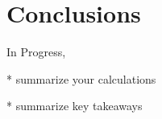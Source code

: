 \documentclass[twocolumn,prd,nofootinbib]{revtex4}
\newcommand\AddedResponse[1]{{\color{blue} {#1}}}
\newcommand\editremark[1]{{\color{red} #1}}
\newcommand{\mc}{{\cal M}}
\begin{document}














\section{Conclusions}
\label{sec:conclude}
In Progress, 




* summarize your calculations

* summarize key takeaways
\end{document}
